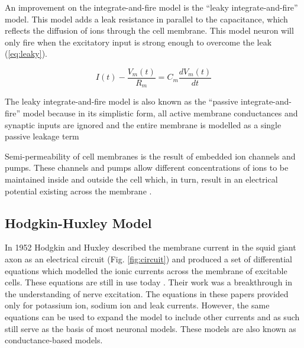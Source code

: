 An improvement on the integrate-and-fire model is the ``leaky integrate-and-fire'' model. This model adds a leak resistance in parallel to the capacitance, which reflects the diffusion of ions through the cell membrane. This model neuron will only fire when the excitatory input is strong enough to overcome the leak (\ref{eq:leaky}).

\begin{equation}
\label{eq:leaky}
I(t)-\frac{V_{m}(t)}{R_{m}}=C_{m}\frac{dV_{m}(t)}{dt}
\end{equation}

The leaky integrate-and-fire model is also known as the ``passive integrate-and-fire'' model because in its simplistic form, all active membrane conductances and synaptic inputs are ignored and the entire membrane is modelled as a single passive leakage term \cite{Dayan2001} %

Semi-permeability of cell membranes is the result of embedded ion channels and pumps. These channels and pumps allow different concentrations of ions to be maintained inside and outside the cell which, in turn, result in an electrical potential existing across the membrane \cite{Sterratt2011}. 

\subsection{Hodgkin-Huxley Model}
\label{sec:hogkin_huxley_model}

In 1952 Hodgkin and Huxley described the membrane current in the squid giant axon as an electrical circuit (Fig. \ref{fig:circuit}) and produced a set of differential equations which modelled the ionic currents across the membrane of excitable cells. These equations are still in use today \cite{Hodgkin1952, Hodgkin1952a, Hodgkin1952b, Hodgkin1952c, Hodgkin1952d}. Their work was a breakthrough in the understanding of nerve excitation. The equations in these papers provided only for potassium ion, sodium ion and leak currents. However, the same equations can be used to expand the model to include other currents and as such still serve as the basis of most neuronal models. These models are also known as conductance-based models.

